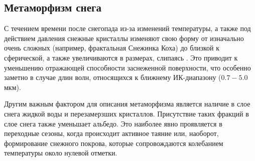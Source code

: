 \documentclass[a4paper, fontsize=14pt]{scrartcl}
\begin{document}
\subsection{Метаморфизм снега}

С течением времени после снегопада из-за изменений температуры, а также под действием давления снежные кристаллы изменяют свою форму от изначально очень сложных (например, фрактальная Снежинка Коха) до близкой к сферической, а также увеличиваются в размерах, слипаясь \cite{Grenfell1999, Grenfell2005, He2018}. Это приводит к уменьшению отражающей способности заснеженной поверхности, что особенно заметно в случае длин волн, относящихся к ближнему ИК-диапазону ($0.7-5.0$ мкм). 

Другим важным фактором для описания метаморфизма является наличие в слое снега жидкой воды и перезамерзших кристаллов. Присутствие таких фракций в слое снега также уменьшает альбедо. Это наиболее явно проявляется в переходные сезоны, когда происходит активное таяние или, наоборот, формирование снежного покрова, которые сопровождаются колебанием температуры около нулевой отметки.
\end{document}
